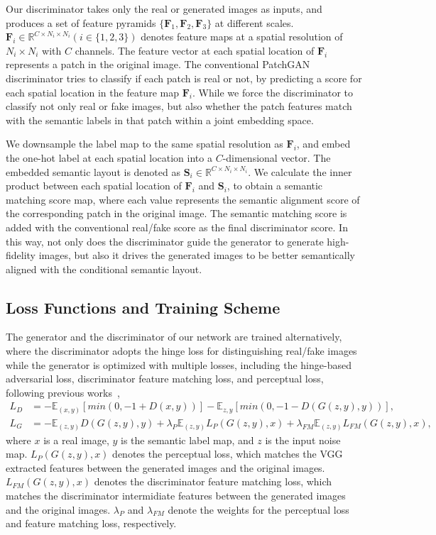 \documentclass{article}
\begin{document}
Our discriminator takes only the real or generated images as inputs, and produces a set of feature pyramids $\{\mathbf{F}_1, \mathbf{F}_2, \mathbf{F}_3\}$ at different scales.
$\mathbf{F}_i\in \mathbb{R}^{C\times N_i\times N_i} (i \in \{1,2,3\})$ denotes feature maps at a spatial resolution of $N_i\times N_i$ with $C$ channels.
The feature vector at each spatial location of $\mathbf{F}_i$ represents a patch in the original image.
The conventional PatchGAN discriminator tries to classify if each patch is real or not, by predicting a score for each spatial location in the feature map $\mathbf{F}_i$.
While we force the discriminator to classify not only real or fake images, but also whether the patch features match with the semantic labels in that patch within a joint embedding space. 


We downsample the label map to the same spatial resolution as $\mathbf{F}_i$, and embed the one-hot label at each spatial location into a $C$-dimensional vector. 
The embedded semantic layout is denoted as $\mathbf{S}_i\in \mathbb{R}^{C\times N_i\times N_i}$.
We calculate the inner product between each spatial location of $\mathbf{F}_i$ and $\mathbf{S}_i$, to obtain a semantic matching score map, where each value represents the semantic alignment score of the corresponding patch in the original image.
The semantic matching score is added with the conventional real/fake score as the final discriminator score.
In this way, not only does the discriminator guide the generator to generate high-fidelity images, but also it drives the generated images to be better semantically aligned with the conditional semantic layout.

\subsection{Loss Functions and Training Scheme}
The generator and the discriminator of our network are trained alternatively, where the discriminator adopts the hinge loss for distinguishing real/fake images while the generator is optimized with multiple losses, including the hinge-based adversarial loss, discriminator feature matching loss, and perceptual loss, following previous works~\cite{wang2018high,park2019semantic},
\begin{align}
  L_D &= - \mathbb{E}_{(x,y)}[min(0, -1+D(x,y))]-\mathbb{E}_{z,y}[min(0, -1-D(G(z,y),y))],\\
  L_G &= - \mathbb{E}_{(z,y)}D(G(z,y),y) + \lambda_P \mathbb{E}_{(z,y)}L_P(G(z,y),x) + \lambda_{FM} \mathbb{E}_{(z,y)}L_{FM}(G(z,y),x),
\end{align}
where $x$ is a real image, $y$ is the semantic label map, and $z$ is the input noise map.
$L_P(G(z,y),x)$ denotes the perceptual loss, which matches the VGG extracted features between the generated images and the original images.
$L_{FM}(G(z,y),x)$ denotes the discriminator feature matching loss, which matches the discriminator intermidiate features between the generated images and the original images.
$\lambda_P$ and $\lambda_{FM}$ denote the weights for the perceptual loss and feature matching loss, respectively.
\end{document}

